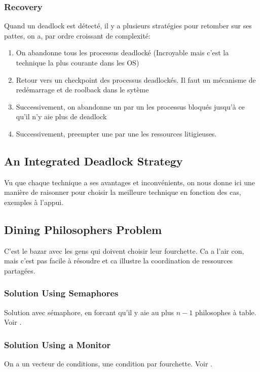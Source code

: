\subsubsection{Recovery}
Quand un deadlock est détecté, il y a plusieurs stratégies pour retomber sur ses pattes,
on a, par ordre croissant de complexité:
\begin{enumerate}
  \item On abandonne tous les processus deadlocké (Incroyable mais c'est la technique la plus courante dans les OS)
  \item Retour vers un checkpoint des processus deadlockés.
    Il faut un mécanisme de redémarrage et de roolback dans le sytème
  \item Successivement, on abandonne un par un les processus bloqués jusqu'à ce qu'il n'y aie plus de deadlock
  \item Successivement, preempter une par une les ressources litigieuses.
\end{enumerate}

\subsection{An Integrated Deadlock Strategy}
Vu que chaque technique a ses avantages et inconvénients,
on nous donne ici une manière de raisonner pour choisir la meilleure technique en fonction des cas, exemples à l'appui.

\subsection{Dining Philosophers Problem}
C'est le bazar avec les gens qui doivent choisir leur fourchette.
Ca a l'air con, mais c'est pas facile à résoudre et ca illustre la coordination de ressources partagées.

\subsubsection{Solution Using Semaphores}
Solution avec sémaphore, en forcant qu'il y aie au plus $n-1$ philosophes à table.
Voir \cite[p.~281]{stallings}.

\subsubsection{Solution Using a Monitor}
On a un vecteur de conditions, une condition par fourchette.
Voir \cite[p.~282]{stallings}.

